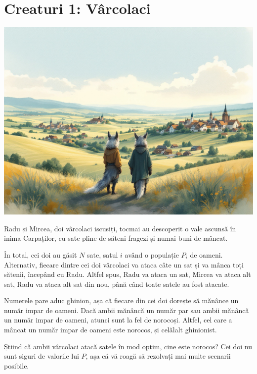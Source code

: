 \documentclass[12pt,a4paper]{article}
\begin{document}


\section*{Creaturi 1: Vârcolaci}


\begin{center}
\includegraphics[scale=0.2]{varcolaci.jpg}
\end{center}

Radu și Mircea, doi vârcolaci iscusiți, tocmai au descoperit o vale ascunsă în inima Carpaților, cu sate pline de săteni fragezi și numai buni de mâncat.

\vspace{1em}

În total, cei doi au găsit $N$ sate, satul $i$ având o populație $P_i$ de oameni. Alternativ, fiecare dintre cei doi vârcolaci va ataca câte un sat și va mânca toți sătenii, începând cu Radu. Altfel spus, Radu va ataca un sat, Mircea va ataca alt sat, Radu va ataca alt sat din nou, până când toate satele au fost atacate.

\vspace{1em}

Numerele pare aduc ghinion, așa că fiecare din cei doi dorește să mănânce un număr impar de oameni. Dacă ambii mănâncă un număr par sau ambii mănâncă un număr impar de oameni, atunci sunt la fel de norocoși. Altfel, cel care a mâncat un număr impar de oameni este norocos, și celălalt ghinionist.

\vspace{1em}

Știind că ambii vârcolaci atacă satele în mod optim, cine este norocos? Cei doi nu sunt siguri de valorile lui $P$, așa că vă roagă să rezolvați mai multe scenarii posibile.
\end{document}
